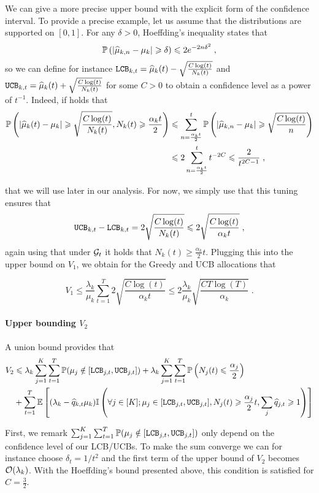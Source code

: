 We can give a more precise upper bound with the explicit form of the confidence interval. To provide a precise example, let us assume that the distributions are supported on $[0,1]$. For any $\delta>0$, Hoeffding's inequality states that 
\[\mathbb{P}\left(|\widehat{\mu}_{k, n}-\mu_k|\geqslant \delta \right)\leqslant 2e^{-2n\delta^2}\;, \]
so we can define for instance $\texttt{LCB}_{k,t} = \widehat{\mu}_k(t) - \sqrt{\frac{C\log(t)}{N_k(t)}} $ and $\texttt{UCB}_{k,t} = \widehat{\mu}_k(t) + \sqrt{\frac{C\log(t)}{N_k(t)}}$ for some $C>0$ to obtain a confidence level as a power of $t^{-1}$. Indeed, if holds that 
\begin{align*} \mathbb{P}\left(|\widehat{\mu}_k(t)- \mu_k|\geqslant \sqrt{\frac{C\log(t)}{N_k(t)}}, N_k(t)\geqslant \frac{\alpha_k t}{2} \right)&\leqslant \sum_{n=\frac{\alpha_k t}{2}}^t \mathbb{P}\left(|\widehat{\mu}_{k, n}- \mu_k|\geqslant \sqrt{\frac{C\log(t)}{n}}\right)  \\
&\leqslant 2 \sum_{n=\frac{\alpha_k t}{2}}^t t^{-2C}\leqslant \frac{2}{t^{2C-1}} \;,
\end{align*}

that we will use later in our analysis. For now, we simply use that this tuning ensures that \[\texttt{UCB}_{k,t}-\texttt{LCB}_{k, t} = 2\sqrt{\frac{C\log(t)}{N_k(t)}} \leqslant 2\sqrt{\frac{C\log(t)}{\alpha_k t}} \;, \]
again using that under $\mathcal{G}_t$ it holds that $N_k(t)\geq \frac{\alpha_k}{2}t$. Plugging this into the upper bound on $V_1$, we obtain for the Greedy and UCB allocations that 

\[V_1 \leq \frac{\lambda_k}{\mu_k} \sum_{t=1}^T 2 \sqrt{\frac{C\log(t)}{\alpha_k t}} \leq 2\frac{\lambda_k}{\mu_k}\sqrt{\frac{CT\log(T)}{\alpha_k}}\;. \] 


\paragraph{Upper bounding $V_2$} A union bound provides that 
\begin{align*}
V_2 & \leqslant \lambda_k \sum_{j=1}^K \sum_{t=1}^T \mathbb{P}(\mu_j \notin [\texttt{LCB}_{j, t}, \texttt{UCB}_{j, t}])  + \lambda_k \sum_{j=1}^K \sum_{t=1}^T\mathbb{P}\left(N_j(t)\leqslant \frac{\alpha_j}{2}\right) \\
&+ \sum_{t=1}^T \mathbb{E}\left[(\lambda_k - \widehat{q}_{k,t}\mu_k)\mathbb{I}\left(\forall j \in [K]; \mu_j \in [\texttt{LCB}_{j, t}, \texttt{UCB}_{j, t}], N_j(t)\geqslant \frac{\alpha_j}{2}t,  \sum_j \widehat{q}_{j,t} \geqslant 1\right)\right] 
\end{align*}
 
First, we remark $\sum_{j=1}^K \sum_{t=1}^T \mathbb{P}(\mu_j \notin [\texttt{LCB}_{j, t}, \texttt{UCB}_{j, t}])$ only depend on the confidence level of our LCB/UCBs. To make the sum converge we can for instance choose $\delta_t = 1/t^2$ and the first term of the upper bound of $V_2$ becomes $\mathcal{O}(\lambda_k)$. With the Hoeffding's bound presented above, this condition is satisfied for $C=\frac{3}{2}$.

